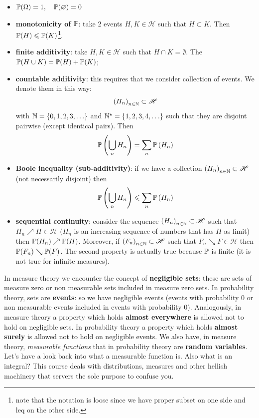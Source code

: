 \documentclass{report}
\begin{document}
\begin{itemize}
	\item $\mathbb{P}(\Omega)=1,\quad\mathbb{P}(\varnothing)=0$
	\item \textbf{monotonicity of $\mathbb{P}$}: take 2 events $H,K\in\mathscr{H}$ such that $H\subset K$. Then $\mathbb{P}(H)\leqslant\mathbb{P}(K)$\footnote{note that the notation is loose since we have proper subset on one side and leq on the other side.}.
	\item \textbf{finite additivity}: take $H,K\in\mathscr{H}$ such that $H\cap K=\emptyset$. The $\mathbb{P}(H\cup K)=\mathbb{P}(H)+\mathbb{P}(K)$;
	\item \textbf{countable additivity}: this requires that we consider collection of events. We denote them in this way:
	\[\left(H_n\right)_{n\in\mathbb{N}}\subset\mathscr{H}\] with $\mathbb{N}=\{0,1,2,3,\ldots\}$ and $\mathbb{N}^\star=\{1,2,3,4,\ldots\}$ such that they are disjoint pairwise (except identical pairs). Then
	\[\mathbb{P}\left(\bigcup_nH_n\right)=\sum_n\mathbb{P}\left(H_n\right)\]
	\item \textbf{Boole inequality (sub-additivity)}: if we have a collection $\left(H_n\right)_{n\in\mathbb{N}}\subset\mathscr{H}$ (not necessarily disjoint) then $$\mathbb{P}\left(\bigcup_nH_n\right)\leqslant\sum_n\mathbb{P}\left(H_n\right)$$ 
	\item \textbf{sequential continuity}: consider the sequence $\left(H_n\right)_{n\in\mathbb{N}}\subset\mathscr{H}$ such that $H_n\nearrow H\in\mathscr{H}$ ($H_n$ is an increasing sequence of numbers that has $H$ as limit) then $\mathbb{P}(H_n)\nearrow\mathbb{P}(H)$. Moreover, if $\left(F_n\right)_{n\in\mathbb{N}}\subset\mathscr{H}$ such that $F_n\searrow F\in\mathscr{H}$ then $\mathbb{P}(F_n)\searrow\mathbb{P}(F)$. The second property is actually true because $\mathbb{P}$ is finite (it is not true for infinite measures). 
\end{itemize}
In measure theory we encounter the concept of \textbf{negligible sets}: these are sets of measure zero or non measurable sets included in measure zero sets. In probability theory, sets are \textbf{events}: so we have negligible events (events with probability 0 or non measurable events included in events with probability 0). Analogously, in measure theory a property which holds \textbf{almost everywhere} is allowed not to hold on negligible sets. In probability theory a property which holds \textbf{almost surely} is allowed not to hold on negligible events.
We also have, in measure theory, \textit{measurable functions} that in probability theory are \textbf{random variables}.
Let's have a look back into what a measurable function is. Also what is an integral? This course deals with distributions, measures and other hellish machinery that servers the sole purpose to confuse you.
\end{document}
